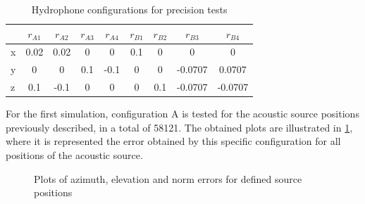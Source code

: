 \begin{table}[!htbp] %
	\begin{center}
		\begin{tabular}{ l | c c c c | c c c c }
	    	\toprule
			\multicolumn{1}{c|}{} & $r_{A1}$ & $r_{A2}$ & $r_{A3}$ & $r_{A4}$ & $r_{B1}$ & $r_{B2}$ & $r_{B3}$ & $r_{B4}$ \\
			\midrule
			\multirow{1}{0.5em}{x} 
			& 0.02 & 0.02 & 0 & 0 & 0.1 & 0 & 0 & 0 \\
			\multirow{1}{0.5em}{y} 
			& 0 & 0 & 0.1 & -0.1 & 0 & 0 & -0.0707 & 0.0707\\
			\multirow{1}{0.5em}{z} 
			& 0.1 & -0.1  & 0 & 0 & 0 & 0.1 & -0.0707  & -0.0707\\
			\bottomrule 
		\end{tabular}
		\caption{Hydrophone configurations for precision tests}
		\label{tab:configs_test1}
	\end{center}
\end{table}

For the first simulation, configuration A is tested for the acoustic source positions previously described, in a total of 58121. The obtained plots are illustrated in \ref{fig:s1-A-n10}, where it is represented the error obtained by this specific configuration for all positions of the acoustic source.

\begin{figure}[!htbp]
	
	\captionsetup{justification=centering,margin=2cm}
	\caption{Plots of azimuth, elevation and norm errors for defined source positions}
	\label{fig:s1-A-n10}
\end{figure}

